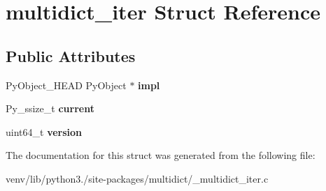 \hypertarget{structmultidict__iter}{}\section{multidict\+\_\+iter Struct Reference}
\label{structmultidict__iter}
\subsection*{Public Attributes}
\begin{DoxyCompactItemize}
\item 
\mbox{\label{structmultidict__iter_a6138d49a33c08a30c712e6760db94411}} 
Py\+Object\+\_\+\+H\+E\+AD Py\+Object $\ast$ {\bfseries impl}
\item 
\mbox{\label{structmultidict__iter_aba008fedc0018cb83aa1b62e527ba939}} 
Py\+\_\+ssize\+\_\+t {\bfseries current}
\item 
\mbox{\label{structmultidict__iter_a09a0d4000b93430933527bf334f021e2}} 
uint64\+\_\+t {\bfseries version}
\end{DoxyCompactItemize}


The documentation for this struct was generated from the following file\+:\begin{DoxyCompactItemize}
\item 
venv/lib/python3./site-\/packages/multidict/\+\_\+multidict\+\_\+iter.\+c\end{DoxyCompactItemize}

